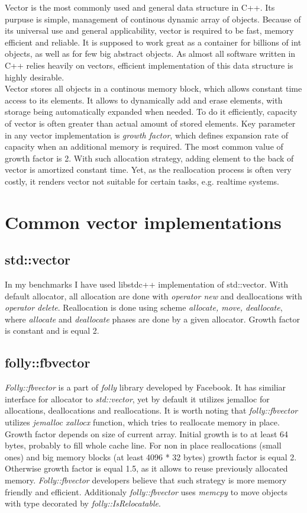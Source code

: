 \documentclass[inz, english, shortabstract]{iithesis}
\begin{document}
Vector is the most commonly used and general data structure in C++. Its purpuse is simple, management of continous dynamic array of objects. Because of its universal use and general applicability, vector is required to be fast, memory efficient and reliable. It is supposed to work great as a container for billions of int objects, as well as for few big abstract objects. As almost all software written in C++ relies heavily on vectors, efficient implementation of this data structure is highly desirable.
\\
Vector stores all objects in a continous memory block, which allows constant time access to its elements. It allows to dynamically add and erase elements, with storage being automatically expanded when needed. To do it efficiently, capacity of vector is often greater than actual amount of stored elements. Key parameter in any vector implementation is {\it growth factor}, which defines expansion rate of capacity when an additional memory is required. The most common value of growth factor is 2. With such allocation strategy, adding element to the back of vector is amortized constant time. Yet, as the reallocation process is often very costly, it renders vector not suitable for certain tasks, e.g. realtime systems. 

\chapter{Common vector implementations}
\section{std::vector}
In my benchmarks I have used libstdc++ implementation\cite{std::vector_impl} of std::vector. With default allocator, all allocation are done with {\it operator new} and deallocations with {\it operator delete}. Reallocation is done using scheme {\it allocate, move, deallocate}, where {\it allocate} and {\it  deallocate} phases are done by a given allocator. Growth factor is constant and is equal 2.

\section{folly::fbvector}
{\it Folly::fbvector}\cite{folly::fbvector_impl} is a part of {\it folly} library developed by Facebook. It has similiar interface for allocator to {\it std::vector}, yet by default it utilizes jemalloc for allocations, deallocations and reallocations\cite{folly::fbvector_description}. It is worth noting that {\it folly::fbvector} utilizes {\it jemalloc xallocx} function, which tries to reallocate memory in place. Growth factor depends on size of current array. Initial growth is to at least 64 bytes, probably to fill whole cache line. For non in place reallocations (small ones) and big memory blocks (at least 4096 * 32 bytes) growth factor is equal 2. Otherwise growth factor is equal 1.5, as it allows to reuse previously allocated memory. {\it Folly::fbvector} developers believe that such strategy is more memory friendly and efficient\cite{folly::fbvector_description}. Additionaly {\it folly::fbvector} uses {\it memcpy} to move objects with type decorated by {\it folly::IsRelocatable}.
\end{document}
